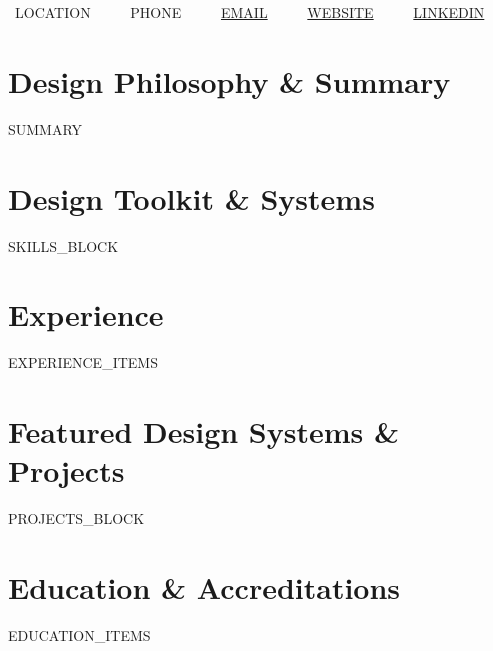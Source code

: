 \documentclass[10pt,letterpaper]{article}
\begin{document}
\begin{center}
  {\Huge \textbf{}} \\[4pt]
  {\Large \textbf{}} \\[6pt]
  \small \color{mutedtext}
  \faMapMarker* \ {{LOCATION}} \ \ \textbar\ \ 
  \faPhone \ {{PHONE}} \ \ \textbar\ \ 
  \faEnvelope \ \href{mailto:{{EMAIL}}}{{{EMAIL}}} \ \ \textbar\ \ 
  \faGlobe \ \href{https://{{WEBSITE}}}{{{WEBSITE}}} \ \ \textbar\ \ 
  \faLinkedin \ \href{https://{{LINKEDIN}}}{{{LINKEDIN}}}
\end{center}

\vspace{2pt}

\section{Design Philosophy \& Summary}
\small
{{SUMMARY}}

\section{Design Toolkit \& Systems}
\small
{{SKILLS_BLOCK}}

\section{Experience}
\small
{{EXPERIENCE_ITEMS}}

\section{Featured Design Systems \& Projects}
\small
{{PROJECTS_BLOCK}}

\section{Education \& Accreditations}
\small
{{EDUCATION_ITEMS}}
\end{document}
